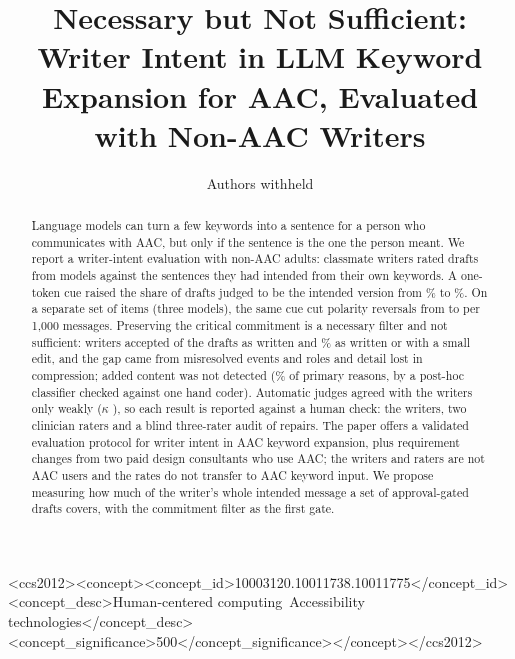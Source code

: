 \documentclass[manuscript,review]{acmart}
\begin{document}
\title{Necessary but Not Sufficient: Writer Intent in LLM Keyword Expansion for AAC, Evaluated with Non-AAC Writers}

\author{Authors withheld}

\begin{abstract}
Language models can turn a few keywords into a sentence for a person who communicates with AAC, but only if the sentence is the one the person meant. We report a writer-intent evaluation with non-AAC adults: \jmpOneEightWriters{} classmate writers rated \jmpOneEightAcceptN{} drafts from \jmwmModels{} models against the sentences they had intended from their own keywords.
A one-token cue raised the share of drafts judged to be the intended version from \jmpOneEightMatchBare{}\% to \jmpOneEightMatchChip{}\%.
On a separate set of \jmfOneUnits{} items (three models), the same cue cut polarity reversals from \jmfOneRevPolBare{} to \jmfOneRevPolChip{} per 1,000 messages.
Preserving the critical commitment is a necessary filter and not sufficient: writers accepted \jmpOneEightAcceptYesK{} of the \jmpOneEightAcceptN{} drafts as written and \jmpOneEightAcceptYesSmall{}\% as written or with a small edit, and the gap came from misresolved events and roles and detail lost in compression; added content was not detected (\jmwmAdded{}\% of primary reasons, by a post-hoc classifier checked against one hand coder).
Automatic judges agreed with the writers only weakly ($\kappa$ \jmpOneEightKappa{}), so each result is reported against a human check: the writers, two clinician raters and a blind three-rater audit of repairs.
The paper offers a validated evaluation protocol for writer intent in AAC keyword expansion, plus requirement changes from two paid design consultants who use AAC; the writers and raters are not AAC users and the rates do not transfer to AAC keyword input.
We propose measuring how much of the writer's whole intended message a set of approval-gated drafts covers, with the commitment filter as the first gate.
\end{abstract}

\begin{CCSXML}
<ccs2012><concept><concept_id>10003120.10011738.10011775</concept_id><concept_desc>Human-centered computing~Accessibility technologies</concept_desc><concept_significance>500</concept_significance></concept></ccs2012>
\end{CCSXML}

\maketitle










\end{document}
